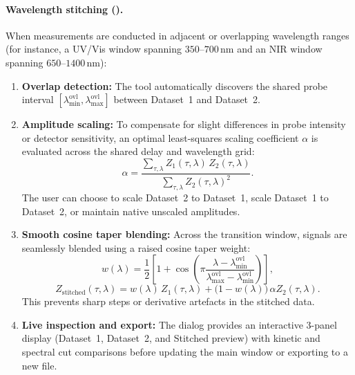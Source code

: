 \paragraph{Wavelength stitching ().}
When measurements are conducted in adjacent or overlapping wavelength ranges (for instance, a UV/Vis window spanning $350$--$700\,\mathrm{nm}$ and an NIR window spanning $650$--$1400\,\mathrm{nm}$):
\begin{enumerate}
  \item \textbf{Overlap detection:} The tool automatically discovers the shared probe interval $[\lambda_{\mathrm{min}}^{\mathrm{ovl}}, \lambda_{\mathrm{max}}^{\mathrm{ovl}}]$ between Dataset~1 and Dataset~2.
  \item \textbf{Amplitude scaling:} To compensate for slight differences in probe intensity or detector sensitivity, an optimal least-squares scaling coefficient $\alpha$ is evaluated across the shared delay and wavelength grid:
    \begin{equation}
      \alpha = \frac{\sum_{\tau, \lambda} Z_1(\tau, \lambda)\, Z_2(\tau, \lambda)}{\sum_{\tau, \lambda} Z_2(\tau, \lambda)^2}.
    \end{equation}
    The user can choose to scale Dataset~2 to Dataset~1, scale Dataset~1 to Dataset~2, or maintain native unscaled amplitudes.
  \item \textbf{Smooth cosine taper blending:} Across the transition window, signals are seamlessly blended using a raised cosine taper weight:
    \begin{equation}
      w(\lambda) = \frac{1}{2} \left[ 1 + \cos\left( \pi \frac{\lambda - \lambda_{\mathrm{min}}^{\mathrm{ovl}}}{\lambda_{\mathrm{max}}^{\mathrm{ovl}} - \lambda_{\mathrm{min}}^{\mathrm{ovl}}} \right) \right],
    \end{equation}
    \begin{equation}
      Z_{\mathrm{stitched}}(\tau, \lambda) = w(\lambda)\, Z_1(\tau, \lambda) + \big(1 - w(\lambda)\big)\, \alpha Z_2(\tau, \lambda).
    \end{equation}
    This prevents sharp steps or derivative artefacts in the stitched data.
  \item \textbf{Live inspection and export:} The dialog provides an interactive 3-panel display (Dataset~1, Dataset~2, and Stitched preview) with kinetic and spectral cut comparisons before updating the main window or exporting to a new  file.
\end{enumerate}

